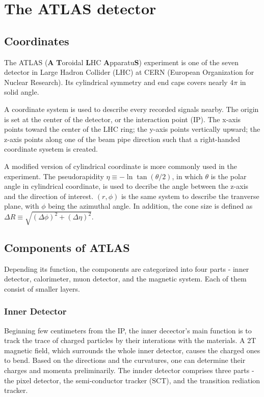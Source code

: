 \documentclass[class=NCU_thesis, crop=false]{standalone}
\begin{document}
\chapter{The ATLAS detector}
\section{Coordinates}
	The ATLAS (\textbf{A} \textbf{T}oroidal \textbf{L}HC \textbf{A}pparatu\textbf{S}) experiment is one of the seven detector in Large Hadron Collider (LHC) at CERN (European Organization for Nuclear Research). Its cylindrical symmetry and end caps covers nearly $4\pi$ in solid angle.
	
	A coordinate system is used to describe every recorded signals nearby. The origin is set at the center of the detector, or the interaction point (IP). The x-axis points toward the center of the LHC ring; the y-axis points vertically upward; the z-axis points along one of the beam pipe direction such that a right-handed coordinate sysetem is created.
	
	A modified version of cylindrical coordinate is more commonly used in the experiment. The pseudorapidity $\eta \equiv -\ln\tan(\theta / 2)$, in which $\theta$ is the polar angle in cylindrical coordinate, is used to decribe the angle between the z-axis and the direction of interest. $(r, \phi)$ is the same system to describe the tranverse plane, with $\phi$ being the azimuthal angle. In addition, the cone size is defined as $\Delta R \equiv \sqrt{(\Delta \phi)^2 + (\Delta \eta)^2}$.

\section{Components of ATLAS}
	Depending its function, the components are categorized into four parts - inner detector, calorimeter, muon detector, and the magnetic system. Each of them consist of smaller layers.
	
	\subsection{Inner Detector}
		Beginning few centimeters from the IP, the inner decector's main function is to track the trace of charged particles by their interations with the materials. A 2T magnetic field, which surrounds the whole inner detector, causes the charged ones to bend. Based on the directions and the curvatures, one can determine their charges and momenta preliminarily. The innder detector comprises three parts - the pixel detector, the semi-conductor tracker (SCT), and the transition rediation tracker.
		
\end{document}
